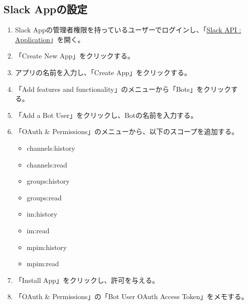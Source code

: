 \documentclass[a4j, 11pt]{jsarticle}
\begin{document}
\subsection{Slack Appの設定}
\begin{enumerate}
\item Slack Appの管理者権限を持っているユーザーでログインし、「\href{https://api.slack.com/apps}{Slack API : Application}」を開く。
\item 「Create New App」をクリックする。
\item アプリの名前を入力し、「Create App」をクリックする。
\item 「Add features and functionality」のメニューから「Bots」をクリックする。
\item 「Add a Bot User」をクリックし、Botの名前を入力する。
\item 「OAuth \& Permissions」のメニューから、以下のスコープを追加する。
\begin{itemize}
\item channels:history
\item channels:read
\item groups:history
\item groups:read
\item im:history
\item im:read
\item mpim:history
\item mpim:read
\end{itemize}
\item 「Install App」をクリックし、許可を与える。
\item 「OAuth \& Permissions」の「Bot User OAuth Access Token」をメモする。
\end{enumerate}
\end{document}
